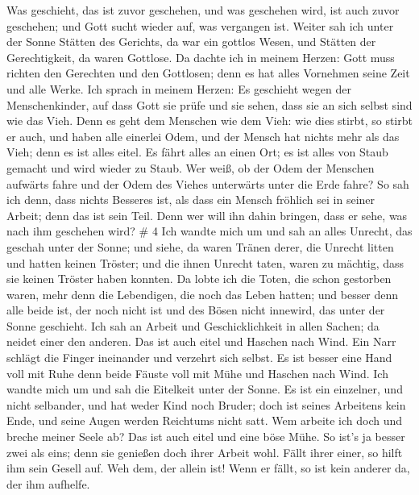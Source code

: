  Was geschieht, das ist zuvor geschehen, und was geschehen
wird, ist auch zuvor geschehen; und Gott sucht wieder auf, was vergangen
ist.  Weiter sah ich unter der Sonne Stätten des Gerichts,
da war ein gottlos Wesen, und Stätten der Gerechtigkeit, da waren
Gottlose.  Da dachte ich in meinem Herzen: Gott muss
richten den Gerechten und den Gottlosen; denn es hat alles Vornehmen
seine Zeit und alle Werke.  Ich sprach in meinem Herzen: Es
geschieht wegen der Menschenkinder, auf dass Gott sie prüfe und sie
sehen, dass sie an sich selbst sind wie das Vieh.  Denn es
geht dem Menschen wie dem Vieh: wie dies stirbt, so stirbt er auch, und
haben alle einerlei Odem, und der Mensch hat nichts mehr als das Vieh;
denn es ist alles eitel.  Es fährt alles an einen Ort; es
ist alles von Staub gemacht und wird wieder zu Staub.  Wer
weiß, ob der Odem der Menschen aufwärts fahre und der Odem des Viehes
unterwärts unter die Erde fahre?  So sah ich denn, dass
nichts Besseres ist, als dass ein Mensch fröhlich sei in seiner Arbeit;
denn das ist sein Teil. Denn wer will ihn dahin bringen, dass er sehe,
was nach ihm geschehen wird? \# 4  Ich wandte mich um und
sah an alles Unrecht, das geschah unter der Sonne; und siehe, da waren
Tränen derer, die Unrecht litten und hatten keinen Tröster; und die
ihnen Unrecht taten, waren zu mächtig, dass sie keinen Tröster haben
konnten.  Da lobte ich die Toten, die schon gestorben waren,
mehr denn die Lebendigen, die noch das Leben hatten;  und
besser denn alle beide ist, der noch nicht ist und des Bösen nicht
innewird, das unter der Sonne geschieht.  Ich sah an Arbeit
und Geschicklichkeit in allen Sachen; da neidet einer den anderen. Das
ist auch eitel und Haschen nach Wind.  Ein Narr schlägt die
Finger ineinander und verzehrt sich selbst.  Es ist besser
eine Hand voll mit Ruhe denn beide Fäuste voll mit Mühe und Haschen nach
Wind.  Ich wandte mich um und sah die Eitelkeit unter der
Sonne.  Es ist ein einzelner, und nicht selbander, und hat
weder Kind noch Bruder; doch ist seines Arbeitens kein Ende, und seine
Augen werden Reichtums nicht satt. Wem arbeite ich doch und breche
meiner Seele ab? Das ist auch eitel und eine böse Mühe.  So
ist's ja besser zwei als eins; denn sie genießen doch ihrer Arbeit wohl.
 Fällt ihrer einer, so hilft ihm sein Gesell auf. Weh dem,
der allein ist! Wenn er fällt, so ist kein anderer da, der ihm aufhelfe.
